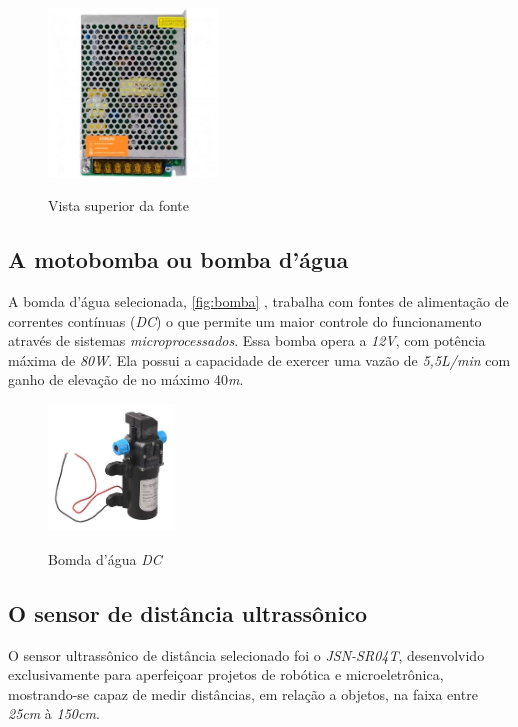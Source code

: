 \begin{figure}[H]
	\centering
	\caption{Vista superior da fonte}
	\includegraphics[width=0.4\textwidth]{figuras/fonte_chaveada.jpg}
	\label{fig:fontechaveada}
\end{figure} 

\subsection{A motobomba ou bomba d'água}

A bomda d'água selecionada, \autoref{fig:bomba} , trabalha com fontes de alimentação de correntes contínuas (\textit{DC}) o que permite um maior controle do funcionamento através de sistemas \textit{microprocessados}. Essa bomba opera a \textit{12V}, com potência máxima de \textit{80W}. Ela possui a capacidade de exercer uma vazão de \textit{5,5L/min} com ganho de elevação de no máximo 40\textit{m}.

\begin{figure}[H]
	\centering
	\caption{Bomda d'água \textit{DC}}
	\includegraphics[width=0.3\textwidth]{figuras/bomba.jpeg}
	\label{fig:bomba}
\end{figure}

\subsection{O sensor de distância ultrassônico}
\label{ssec:sensor_ultra}
O sensor ultrassônico de distância selecionado foi o \textit{JSN-SR04T}, desenvolvido exclusivamente para aperfeiçoar projetos de robótica e microeletrônica, mostrando-se capaz de medir distâncias, em relação a objetos, na faixa entre \textit{25cm} à \textit{150cm}.

